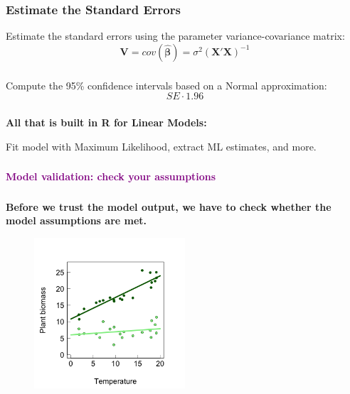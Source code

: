 \documentclass{beamer}
\begin{document}
\begin{frame}
    \frametitle{Estimate the Standard Errors}
    Estimate the standard errors using the parameter variance-covariance matrix:
    \begin{equation*}
        \mathbf{V} = cov(\mathbf{\hat{\beta}})=\sigma^2 (\mathbf{X}' \mathbf{X})^{-1}
    \end{equation*}
\end{frame}

\begin{frame}
    \frametitle{}
    Compute the 95\% confidence intervals based on a Normal approximation:
    \begin{equation*}
        SE \cdot 1.96
    \end{equation*}
\end{frame}

\begin{frame}
    \frametitle{}
    \textbf{All that is built in R for Linear Models:}
    
    Fit model with Maximum Likelihood, extract ML estimates, and more.
\end{frame}

\begin{frame}
    \frametitle{}
    \begin{center}
        \huge\textbf{\textcolor{purple}{Model validation: check your assumptions}}
    \end{center}
\end{frame}

\begin{frame}
    \frametitle{}
    \textbf{Before we trust the model output, we have to check whether the model assumptions are met.}
    
    \begin{figure}[h]
        \centering
        \includegraphics[width=0.5\textwidth]{lectures/day_3_LM_refresh_II/figures/unnamed-chunk-37-1.png} 
    \end{figure}
\end{frame}
\end{document}
